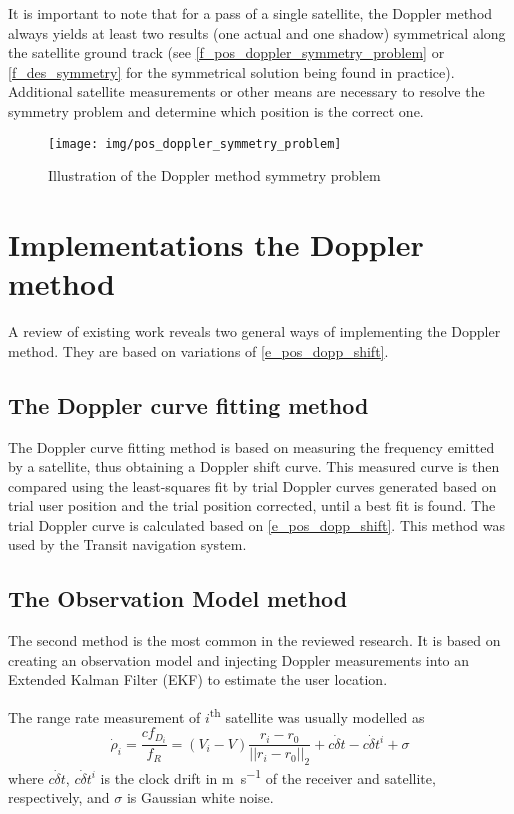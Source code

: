 It is important to note that for a pass of a single satellite, the Doppler method always yields at least two results (one actual and one shadow) symmetrical along the satellite ground track (see \autoref{f_pos_doppler_symmetry_problem} or \autoref{f_des_symmetry} for the symmetrical solution being found in practice). Additional satellite measurements or other means are necessary to resolve the symmetry problem and determine which position is the correct one.

\begin{figure}
    \centering
    \texttt{[image: img/pos\_doppler\_symmetry\_problem]}
    \caption{Illustration of the Doppler method symmetry problem\cite{sop09}}
    \label{f_pos_doppler_symmetry_problem}
\end{figure}



\section{Implementations the Doppler method}
A review of existing work reveals two general ways of implementing the Doppler method. They are based on variations of \autoref{e_pos_dopp_shift}.

\subsection{The Doppler curve fitting method}
\label{s_pos_curve_fit_method}
The Doppler curve fitting method is based on measuring the frequency emitted by a satellite, thus obtaining a Doppler shift curve. This measured curve is then compared using the least-squares fit by trial Doppler curves generated based on trial user position and the trial position corrected, until a best fit is found. The trial Doppler curve is calculated based on \autoref{e_pos_dopp_shift}. This method was used by the Transit navigation system\cite{sat16}.


\subsection{The Observation Model method}
The second method is the most common in the reviewed research. It is based on creating an observation model and injecting Doppler measurements into an Extended Kalman Filter (EKF) to estimate the user location\cite{sop02, sop03, sop13}.

The range rate measurement of $i$\textsuperscript{th} satellite was usually modelled as
\begin{equation}
   \dot\rho_i = \frac{c f_{D_i}}{f_R} = (V_i - V) \frac{r_i - r_0}{||r_i - r_0||_2} + c \dot\delta t - c \dot \delta t^i + \sigma
\end{equation}
where $c \dot\delta t$, $c \dot \delta t^i$ is the clock drift in \unit{\m\per\s} of the receiver and satellite, respectively, and $\sigma$ is Gaussian white noise\cite{sop02}. 


